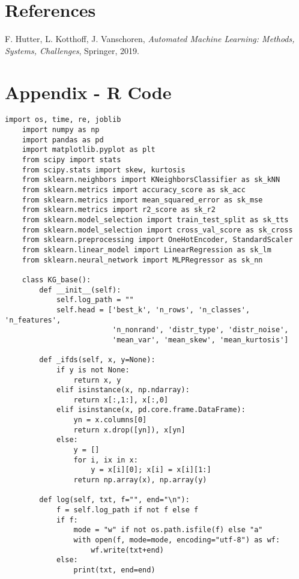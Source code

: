 \documentclass[a4paper,11pt]{article}
\begin{document}
\section{References}
\begin{thebibliography}{9}
F. Hutter, L. Kotthoff, J. Vanschoren, \textit{Automated Machine Learning: Methods, Systems, Challenges}, Springer, 2019.
\end{thebibliography}

\section{Appendix - R Code} 
%
%
\begin{lstlisting}[caption={Exemple de classe Python}, label={lst:python_code}]
    import os, time, re, joblib
    import numpy as np
    import pandas as pd
    import matplotlib.pyplot as plt
    from scipy import stats
    from scipy.stats import skew, kurtosis
    from sklearn.neighbors import KNeighborsClassifier as sk_kNN
    from sklearn.metrics import accuracy_score as sk_acc
    from sklearn.metrics import mean_squared_error as sk_mse
    from sklearn.metrics import r2_score as sk_r2
    from sklearn.model_selection import train_test_split as sk_tts
    from sklearn.model_selection import cross_val_score as sk_cross
    from sklearn.preprocessing import OneHotEncoder, StandardScaler
    from sklearn.linear_model import LinearRegression as sk_lm
    from sklearn.neural_network import MLPRegressor as sk_nn
    
    class KG_base():
        def __init__(self):
            self.log_path = ""
            self.head = ['best_k', 'n_rows', 'n_classes', 'n_features',
                         'n_nonrand', 'distr_type', 'distr_noise', 
                         'mean_var', 'mean_skew', 'mean_kurtosis']
    
        def _ifds(self, x, y=None):
            if y is not None:
                return x, y
            elif isinstance(x, np.ndarray):
                return x[:,1:], x[:,0]
            elif isinstance(x, pd.core.frame.DataFrame):
                yn = x.columns[0]
                return x.drop([yn]), x[yn]
            else:
                y = []
                for i, ix in x:
                    y = x[i][0]; x[i] = x[i][1:]
                return np.array(x), np.array(y)
    
        def log(self, txt, f="", end="\n"):
            f = self.log_path if not f else f
            if f:
                mode = "w" if not os.path.isfile(f) else "a"
                with open(f, mode=mode, encoding="utf-8") as wf:
                    wf.write(txt+end)
            else:
                print(txt, end=end)
    

\end{lstlisting}
\end{document}
